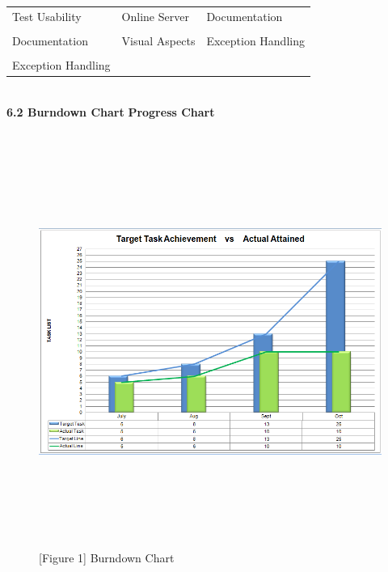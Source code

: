 \documentclass[29pt,a4paper]{moderncv}
\begin{document}
\begin{tabular}{| p{7cm} | p{7cm} | p{7cm} |}
   				\\Test Usability & Online Server & Documentation\\
   				
   				\\Documentation & Visual Aspects & Exception Handling\\
   				
   				\\Exception Handling & & \\
   				
 			\end{tabular} \\
\newpage
		\noindent\textbf{6.2 Burndown Chart}
		\noindent\textbf{Progress Chart}
		\begin{figure}
			\centering
			\\ \includegraphics[width=6.0in, height=5.0in]{./chart.png}
			\\\caption{[Figure 1] Burndown Chart}
		\end{figure}\\
		
\end{document}
